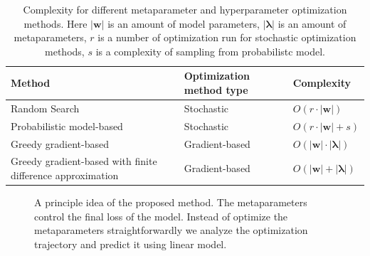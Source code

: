 \documentclass[runningheads]{llncs}
\begin{document}
\begin{table}[]
\caption{Complexity for different metaparameter and hyperparameter optimization methods. Here $|\mathbf{w}|$ is an amount of model parameters, $|\boldsymbol{\lambda}|$ is an amount of metaparameters, $r$ is a number of optimization run for stochastic optimization methods, $s$ is a complexity of sampling from probabilistc model.}
\centering
\begin{tabularx}{\textwidth}{X|X|X} \hline
\bf {Method} & \bf {Optimization method type}  & \bf{Complexity}  \\ \hline \hline 
Random Search~\cite{bergstra2012random} & Stochastic & $O(r\cdot|\mathbf{w}|)$      \\ \hline
Probabilistic model-based~\cite{bergstra2013making}  & Stochastic                                    & $O(r \cdot|\mathbf{w}| + s)$               \\ \hline
Greedy gradient-based~\cite{journals/corr/LuketinaBR15}                    & Gradient-based                                &$O(|\mathbf{w}|\cdot|\boldsymbol{\lambda}|)$    \\ \hline
Greedy gradient-based with finite difference approximation~\cite{liu2018darts} & Gradient-based                                & $O(|\mathbf{w}| + |\boldsymbol{\lambda}|)$   \\ \hline
\end{tabularx}
\vspace{0.2cm}
\label{table:compl}

\end{table}

\begin{figure}[ht]
    \caption{A principle idea of the proposed method. The metaparameters control the final loss of the model. Instead of optimize the metaparameters straightforwardly we analyze the optimization trajectory and predict it using linear model.}
    \label{fig:trajectory}
\end{figure}
\end{document}
